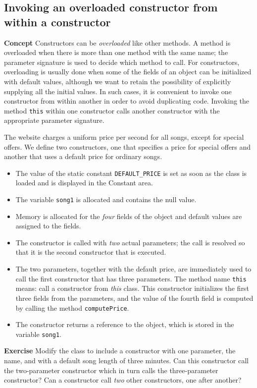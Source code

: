 \subsection{Invoking an overloaded constructor from within a constructor}\label{con.04}

\textbf{Concept} Constructors can be \emph{overloaded} like other methods. A method is overloaded when there is more than one method with the same name; the parameter signature is used to decide which method to call. For constructors, overloading is usually done when some of the fields of an object can be initialized with default values, although we want to retain 
the possibility of explicitly supplying all the initial values. In such cases, it is convenient to invoke one constructor from within another in order to avoid duplicating code. Invoking the method \texttt{this} within one constructor calls another constructor
with the appropriate parameter signature.


The website charges a uniform price per second for all songs, except for special offers. We define two constructors, one that specifies a price for special offers and another that uses a default price for ordinary songs.
\begin{itemize}
\item The value of the static constant \texttt{DEFAULT\_PRICE} is set as soon as the class is loaded and is displayed in the Constant area.
\item The variable \texttt{song1} is allocated and contains the null value.
\item Memory is allocated for the \emph{four} fields of the object and default values are assigned to the fields. 
\item The constructor is called with \emph{two} actual parameters; the call is resolved so that it is the second constructor that is executed. 
\item The two parameters, together with the default price, are immediately used to call the 
first constructor that has three parameters. The method name \texttt{this} means: call a
constructor from \emph{this} class. This constructor initializes the first three fields from the parameters, and the value of the fourth field is computed by calling the method \texttt{computePrice}.
\item The constructor returns a reference to the object, which is stored in the variable \texttt{song1}.
\end{itemize}

\textbf{Exercise}  Modify the class to include a constructor with one parameter, the name, and with a default song length of three minutes. Can this constructor call the two-parameter constructor which in turn calls the three-parameter constructor? Can a constructor call \emph{two} other constructors, one after another?
